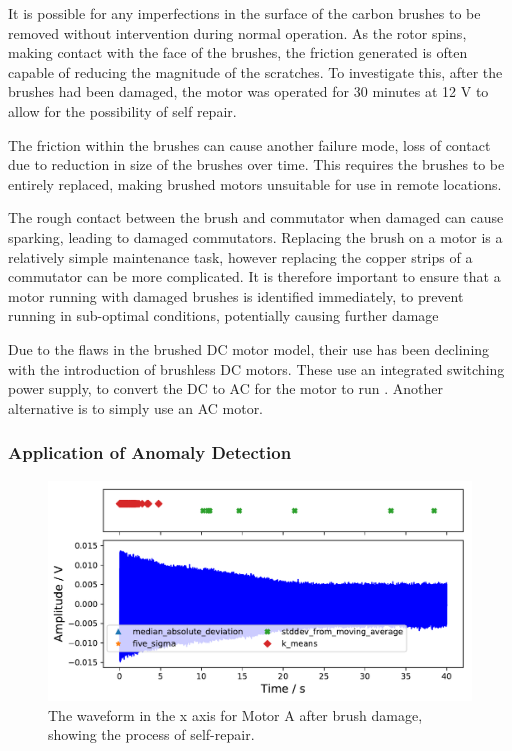 It is possible for any imperfections in the surface of the carbon brushes to be removed without intervention during normal operation. As the rotor spins, making contact with the face of the brushes, the friction generated is often capable of reducing the magnitude of the scratches. To investigate this, after the brushes had been damaged, the motor was operated for 30 minutes at 12 V to allow for the possibility of self repair. %

The friction within the brushes can cause another failure mode, loss of contact due to reduction in size of the brushes over time. This requires the brushes to be entirely replaced, making brushed motors unsuitable for use in remote locations.

The rough contact between the brush and commutator when damaged can cause sparking, leading to damaged commutators. Replacing the brush on a motor is a relatively simple maintenance task, however replacing the copper strips of a commutator can be more complicated. It is therefore important to ensure that a motor running with damaged brushes is identified immediately, to prevent running in sub-optimal conditions, potentially causing further damage

Due to the flaws in the brushed DC motor model, their use has been declining with the introduction of brushless DC motors. These use an integrated switching power supply, to convert the DC to AC for the motor to run \cite{hanselman2003brushless}. Another alternative is to simply use an AC motor. 

\subsubsection{Application of Anomaly Detection}

\begin{figure}[t]
    \includegraphics[width=1.0\textwidth]{fig/large_manual_repair_large_12V.pdf}
    \caption[Anomaly Test Brush Damage]{The waveform in the x axis for Motor A after brush damage, showing the process of self-repair.}
    \label{fig:largemotor_brushdamage}
\end{figure}

